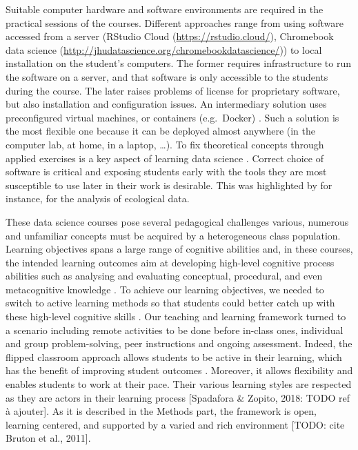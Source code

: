 \documentclass{aims}
\theoremstyle{definition}
\begin{document}
Suitable computer hardware and software environments are required in the
practical sessions of the courses. Different approaches range from using
software accessed from a server (RStudio Cloud
(\url{https://rstudio.cloud/}), Chromebook data science
(\url{http://jhudatascience.org/chromebookdatascience/})) to local
installation on the student's computers. The former requires
infrastructure to run the software on a server, and that software is
only accessible to the students during the course. The later raises
problems of license for proprietary software, but also installation and
configuration issues. An intermediary solution uses preconfigured
virtual machines, or containers (e.g.~Docker)
\cite{Cetinkaya-Rundel2018, Boettiger2015}. Such a solution is the most
flexible one because it can be deployed almost anywhere (in the computer
lab, at home, in a laptop, \ldots). To fix theoretical concepts through
applied exercises is a key aspect of learning data science
\cite{Larwin2011}. Correct choice of software is critical and exposing
students early with the tools they are most susceptible to use later in
their work is desirable. This was highlighted by \cite{Auker2020} for
instance, for the analysis of ecological data.

These data science courses pose several pedagogical challenges various,
numerous and unfamiliar concepts must be acquired by a heterogeneous
class population. Learning objectives spans a large range of cognitive
abilities and, in these courses, the intended learning outcomes aim at
developing high-level cognitive process abilities such as analysing and
evaluating conceptual, procedural, and even metacognitive knowledge
\cite{Krathwohl2002}. To achieve our learning objectives, we needed to
switch to active learning methods so that students could better catch up
with these high-level cognitive skills \cite{Freeman2014}. Our teaching
and learning framework turned to a scenario including remote activities
to be done before in-class ones, individual and group problem-solving,
peer instructions and ongoing assessment. Indeed, the flipped classroom
approach allows students to be active in their learning, which has the
benefit of improving student outcomes \cite{Freeman2014}. Moreover, it
allows flexibility and enables students to work at their pace. Their
various learning styles are respected as they are actors in their
learning process {[}Spadafora \& Zopito, 2018: TODO ref à ajouter{]}. As
it is described in the Methods part, the framework is open, learning
centered, and supported by a varied and rich environment {[}TODO: cite
Bruton et al., 2011{]}.
\end{document}
